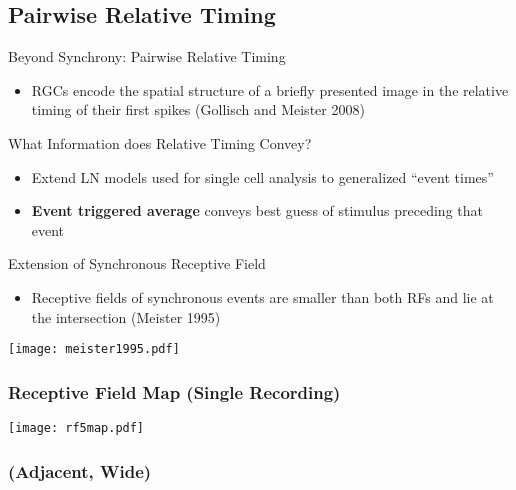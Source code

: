 \documentclass{beamer}
\begin{document}
\subsection{Pairwise Relative Timing}
\frame
{
\begin{block}{Beyond Synchrony: Pairwise Relative Timing}
\begin{itemize}
\item RGCs encode the spatial structure of a briefly presented image in the relative timing of their first spikes (Gollisch and Meister 2008)
\end{itemize}
\end{block}
\begin{block}{What Information does Relative Timing Convey?}
\begin{itemize}
\item Extend LN models used for single cell analysis to generalized ``event times''
\item \textbf{Event triggered average} conveys best guess of stimulus preceding that event
\end{itemize}
\end{block}
}

\frame
{
\begin{block}{Extension of Synchronous Receptive Field}
\begin{itemize}
\item Receptive fields of synchronous events are smaller than both RFs and lie at the intersection (Meister 1995)
\end{itemize}
\end{block}

\begin{center}
\texttt{[image: meister1995.pdf]}
\end{center}
}

\frame
{
\frametitle{Receptive Field Map (Single Recording)}

\begin{center}
\texttt{[image: rf5map.pdf]}
\end{center}
}

\frame
{
\frametitle{ (Adjacent, Wide)}


}
\end{document}

